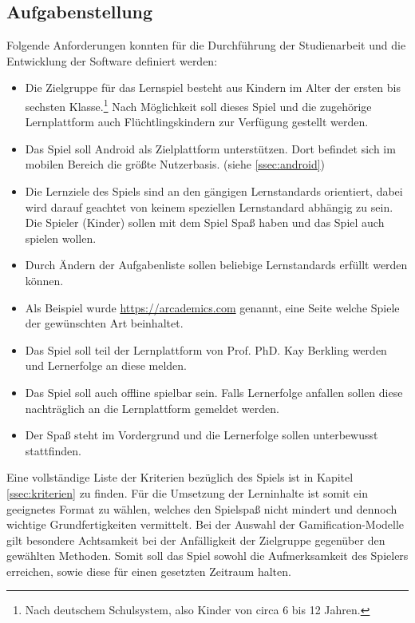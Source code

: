 \subsection{Aufgabenstellung}
	Folgende Anforderungen konnten für die Durchführung der Studienarbeit und die Entwicklung der Software definiert werden:
	\begin{itemize}
		\item{ Die Zielgruppe für das Lernspiel besteht aus Kindern im Alter der ersten bis sechsten Klasse.\footnote{Nach deutschem Schulsystem, also Kinder von circa 6 bis 12 Jahren.} Nach Möglichkeit soll dieses Spiel und die zugehörige Lernplattform auch Flüchtlingskindern zur Verfügung gestellt werden. }
		\item{ Das Spiel soll Android als Zielplattform unterstützen. Dort befindet sich im mobilen Bereich die größte Nutzerbasis. (siehe \ref{ssec:android}) }
		\item{ Die Lernziele des Spiels sind an den gängigen Lernstandards orientiert, dabei wird darauf geachtet von keinem speziellen Lernstandard abhängig zu sein. Die Spieler (Kinder) sollen mit dem Spiel Spaß haben und das Spiel auch spielen wollen. }
		\item{ Durch Ändern der Aufgabenliste sollen beliebige Lernstandards erfüllt werden können. }
		\item{ Als Beispiel wurde \url{https://arcademics.com} genannt, eine Seite welche Spiele der gewünschten Art beinhaltet. }
		\item{ Das Spiel soll teil der Lernplattform von Prof. PhD. Kay Berkling werden und Lernerfolge an diese melden. }
		\item{ Das Spiel soll auch offline spielbar sein. Falls Lernerfolge anfallen sollen diese nachträglich an die Lernplattform gemeldet werden. }
		\item{ Der Spaß steht im Vordergrund und die Lernerfolge sollen unterbewusst stattfinden. }
	\end{itemize}
	Eine vollständige Liste der Kriterien bezüglich des Spiels ist in Kapitel \ref{ssec:kriterien} zu finden.
	Für die Umsetzung der Lerninhalte ist somit ein geeignetes Format zu wählen, welches den Spielspaß nicht mindert und dennoch wichtige Grundfertigkeiten vermittelt.
	Bei der Auswahl der Gamification-Modelle gilt besondere Achtsamkeit bei der Anfälligkeit der Zielgruppe gegenüber den gewählten Methoden. Somit soll das Spiel sowohl die Aufmerksamkeit des Spielers erreichen, sowie diese für einen gesetzten Zeitraum halten.

